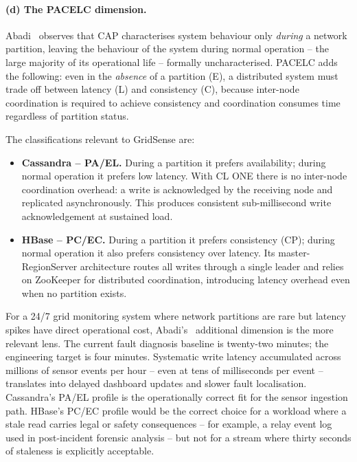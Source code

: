 \documentclass[11pt, a4paper]{article}
\makeatletter
\renewcommand{\_}{\origunderscore\penalty\z@\hskip\z@skip}
\renewcommand{\{}{\origlbrace\penalty\z@\hskip\z@skip}
\renewcommand{\}}{\origrbrace\penalty\z@\hskip\z@skip}
\makeatother
\begin{document}
\paragraph{(d) The PACELC dimension.}
Abadi~\cite{abadi2012} observes that CAP characterises system behaviour
only \emph{during} a network partition, leaving the behaviour of the
system during normal operation -- the large majority of its operational
life -- formally uncharacterised. PACELC adds the following: even in
the \emph{absence} of a partition (E), a distributed system must trade
off between latency (L) and consistency (C), because inter-node
coordination is required to achieve consistency and coordination
consumes time regardless of partition status.

The classifications relevant to GridSense are:
\begin{itemize}
  \item \textbf{Cassandra -- PA/EL.} During a partition it prefers
    availability; during normal operation it prefers low latency. With
    CL ONE there is no inter-node coordination overhead: a write is
    acknowledged by the receiving node and replicated asynchronously.
    This produces consistent sub-millisecond write acknowledgement at
    sustained load.
  \item \textbf{HBase -- PC/EC.} During a partition it prefers
    consistency (CP); during normal operation it also prefers
    consistency over latency. Its master-RegionServer architecture
    routes all writes through a single leader and relies on ZooKeeper
    for distributed coordination, introducing latency overhead even when
    no partition exists.
\end{itemize}

For a 24/7 grid monitoring system where network partitions are rare but
latency spikes have direct operational cost, Abadi's~\cite{abadi2012}
additional dimension is the more relevant lens. The current fault
diagnosis baseline is twenty-two minutes; the engineering target is four
minutes. Systematic write latency accumulated across millions of sensor
events per hour -- even at tens of milliseconds per event -- translates
into delayed dashboard updates and slower fault localisation. Cassandra's
PA/EL profile is the operationally correct fit for the sensor ingestion
path. HBase's PC/EC profile would be the correct choice for a workload
where a stale read carries legal or safety consequences -- for example,
a relay event log used in post-incident forensic analysis -- but not for
a stream where thirty seconds of staleness is explicitly acceptable.
\end{document}
